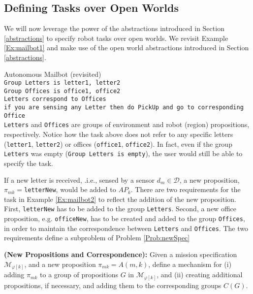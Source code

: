 \subsection{Defining Tasks over Open Worlds}

We will now leverage the power of the abstractions introduced in Section \ref{abstractions} to specify robot tasks over open worlds. We revisit Example \ref{Ex:mailbot1} and make use of the open world abstractions introduced in Section \ref{abstractions}.

\begin{myExample}\label{Ex:mailbot2} Autonomous Mailbot (revisited)\\
\texttt{Group Letters is letter1, letter2}\\
\texttt{Group Offices is office1, office2}\\
\texttt{Letters correspond to Offices}\\
\texttt{if you are sensing any Letter then do PickUp and go to corresponding Office}\\ 
\texttt{Letters} and \texttt{Offices} are groups of environment and robot (region) propositions, respectively. Notice how the task above does not refer to any specific letters (\texttt{letter1}, \texttt{letter2}) or offices (\texttt{office1}, \texttt{office2}). In fact, even if the group \texttt{Letters} was empty (\texttt{Group Letters is empty}), the user would still be able to specify the task.
\end{myExample}

If a new letter is received, .i.e., sensed by a sensor $d_{m} \in \mathcal{D}$, a new proposition, $\pi_{mk} = $\texttt{letterNew}, would be added to $AP_k$. There are two requirements for the task in Example \ref{Ex:mailbot2} to reflect the addition of the new proposition. First, \texttt{letterNew} has to be added to the group \texttt{Letters}. Second, a new office proposition, e.g. \texttt{officeNew}, has to be created and added to the group \texttt{Offices}, in order to maintain the correspondence between \texttt{Letters} and \texttt{Offices}. The two requirements define a subproblem of Problem \ref{Prob:newSpec}

\begin{myProblem}\label{Prob:correspondence}
	\textbf{(New Propositions and Correspondence):} Given a mission specification $\mathcal{M}_{\varphi [k]}$, and a new proposition $\pi_{mk} = A(m, k)$, define a mechanism for (i) adding $\pi_{mk}$ to a group of propositions $G$ in $\mathcal{M}_{\varphi [k]}$, and (ii) creating additional propositions, if necessary, and adding them to the corresponding groups $C(G)$.
\end{myProblem}

